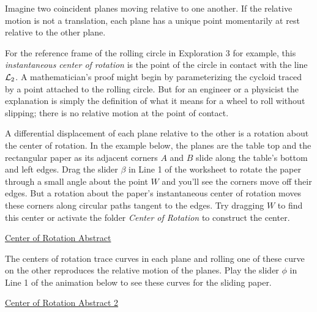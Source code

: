 \documentclass{ximera}
\begin{document}
\begin{exploration} \label{CenterofRotation}

Imagine two coincident planes moving relative to one another. If the relative motion is not a translation, each plane has a unique point momentarily at rest relative to the other plane.   %

For the reference frame of the rolling circle in Exploration 3 for example, this \emph{instantaneous center of rotation} is the point of the circle in contact with the line ${\cal L}_2$. A mathematician's proof might begin by parameterizing the cycloid traced by a point attached to the rolling circle. But for an engineer or a physicist the explanation is simply the definition of what it means for a wheel to roll without slipping; there is no relative motion at the point of contact.

A differential displacement of each plane relative to the other is a rotation about the center of rotation. In the example below, the planes are the table top and the rectangular paper as its adjacent corners $A$ and $B$ slide along the table's  bottom and left edges.  Drag the slider $\beta$ in Line 1 of the worksheet to rotate the paper through a small angle about the point $W$ and you'll see the corners move off their edges. But a rotation about the paper's instantaneous center of rotation moves these corners along circular paths tangent to the edges. Try dragging $W$ to find this center or activate the folder \emph{Center of Rotation} to construct the center.

\begin{onlineOnly}
    \begin{center}
\end{center}
\end{onlineOnly}

\href{https://www.desmos.com/calculator/demmbopxqd}{Center of Rotation Abstract}
\end{exploration}




\begin{exploration} \label{Erp3r}
The centers of rotation trace curves in each plane and rolling one of these curve on the other reproduces the relative motion of the planes. Play the slider $\phi$ in Line 1 of the animation below to see these curves for the sliding paper.


\begin{onlineOnly}
    \begin{center}
\end{center}
\end{onlineOnly}

\href{https://www.desmos.com/calculator/ng2ltiwmnx}{Center of Rotation Abstract 2}
\end{exploration}
\end{document}
